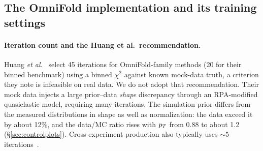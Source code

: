 \subsection{The OmniFold implementation and its training settings}\label{recsec:method-omnifold}

\paragraph{Iteration count and the Huang et al.\ recommendation.} Huang \emph{et al.}~\cite{Huang:2025omnifold} select 45 iterations for OmniFold-family methods (20 for their binned benchmark) using a binned $\chi^{2}$ against known mock-data truth, a criterion they note is infeasible on real data. We do not adopt that recommendation. Their mock data injects a large prior--data \emph{shape} discrepancy through an RPA-modified quasielastic model, requiring many iterations. The simulation prior differs from the measured distributions in shape as well as normalization: the data exceed it by about 12\%, and the data/MC ratio rises with $p_{T}$ from 0.88 to about 1.2 (\S\ref{sec:controlplots}). Cross-experiment production also typically uses ${\sim}5$ iterations~\cite{Canelli:2025guide}.

